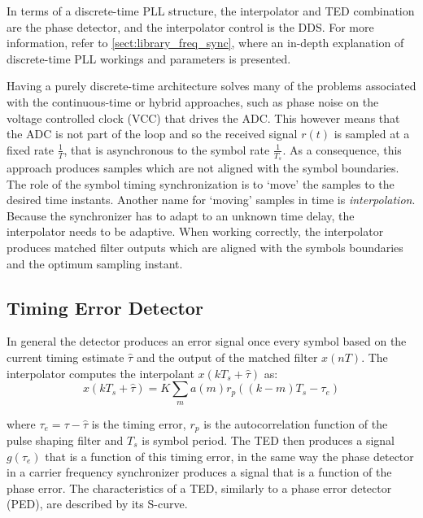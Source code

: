 In terms of a discrete-time PLL structure, the interpolator and TED combination are the phase detector, and the interpolator control is the DDS. For more information, refer to \autoref{sect:library_freq_sync}, where an in-depth explanation of discrete-time PLL workings and parameters is presented.

Having a purely discrete-time architecture solves many of the problems associated with the continuous-time or hybrid approaches, such as phase noise on the voltage controlled clock (VCC) that drives the ADC. This however means that the ADC is not part of the loop and so the received signal $r(t)$ is sampled at a fixed rate $\frac{1}{T}$, that is asynchronous to the symbol rate $\frac{1}{T_s}$. As a consequence, this approach produces samples which are not aligned with the symbol boundaries. The role of the symbol timing synchronization is to `move' the samples to the desired time instants. Another name for `moving' samples in time is \emph{interpolation}. Because the synchronizer has to adapt to an unknown time delay, the interpolator needs to be adaptive. When working correctly, the interpolator produces matched filter outputs which are aligned with the symbols boundaries and the optimum sampling instant.

\subsection{Timing Error Detector}
\label{sect:timing_error_detector}

In general the detector produces an error signal once every symbol based on the current timing estimate $\hat \tau$ and the output of the matched filter $x(nT)$. The interpolator computes the interpolant $x(kT_s+\hat \tau)$ as:
\begin{equation}
x(kT_s+\hat\tau) = K\sum_{m} a(m)r_p\left(\left(k-m\right)T_s-\tau_e\right)
\end{equation}

where $\tau_e=\tau-\hat\tau$ is the timing error, $r_p$ is the autocorrelation function of the pulse shaping filter and $T_s$ is symbol period. The TED then produces a signal $g(\tau_e)$ that is a function of this timing error, in the same way the phase detector in a carrier frequency synchronizer produces a signal that is a function of the phase error. The characteristics of a TED, similarly to a phase error detector (PED), are described by its S-curve.

